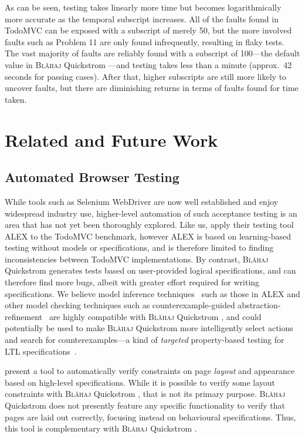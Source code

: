\documentclass[sigplan,nonacm,10pt]{acmart}
\makeatletter
\newcommand{\Quickstrom}[0]{%
  \if@ACM@anonymous%
  \textsc{Bl\aa{}haj}%
  \else%
  Quickstrom%
  \fi\xspace}
\makeatother
\begin{document}
As can be seen, testing takes linearly more time but becomes logarithmically more accurate as the temporal subscript increases.  All of the faults found in TodoMVC can be exposed with a subscript of merely 50,
but the more involved faults such as Problem 11 are only found infrequently, resulting in flaky tests. The vast majority of faults 
are reliably found with a subscript of 100---the default value in \Quickstrom---and testing takes less than a minute (approx.\ 42 seconds for passing cases). After that, higher 
subscripts are still more likely to uncover faults, but there are diminishing returns in terms of faults found for time taken.
 

\section{Related and Future Work}


\subsection{Automated Browser Testing}
\label{ssec:targeted}
While tools such as Selenium WebDriver are now well established and enjoy widespread industry use, higher-level automation of
such acceptance testing is an area that has not yet been thoroughly explored. Like us, \citet{todomvc_learning} apply
their testing tool ALEX to the TodoMVC benchmark, however ALEX is based on learning-based testing without models
or specifications, and is therefore limited to finding inconsistencies between TodoMVC implementations. By contrast,
\Quickstrom generates tests based on user-provided logical specifications, and can therefore find more bugs, albeit with greater effort required for writing specifications.
We believe model inference techniques~\citep{lstar} such as those in ALEX and other model checking techniques such as counterexample-guided abstraction-refinement~\citep{cegar}
are highly compatible with \Quickstrom, and could potentially be used to make \Quickstrom more intelligently select actions and search for counterexamples---a kind of
\emph{targeted} property-based testing for LTL specifications~\citep{targeted,automating_targeted}.

\citet{layout} present a tool to automatically verify constraints on page \emph{layout} and appearance based on high-level specifications. While it is possible to verify some layout constraints with \Quickstrom, that is not
its primary purpose. \Quickstrom does not
presently feature any specific functionality to verify that pages are laid out correctly, focusing instead on behavioural specifications.
Thus, this tool is complementary with \Quickstrom.
\end{document}
